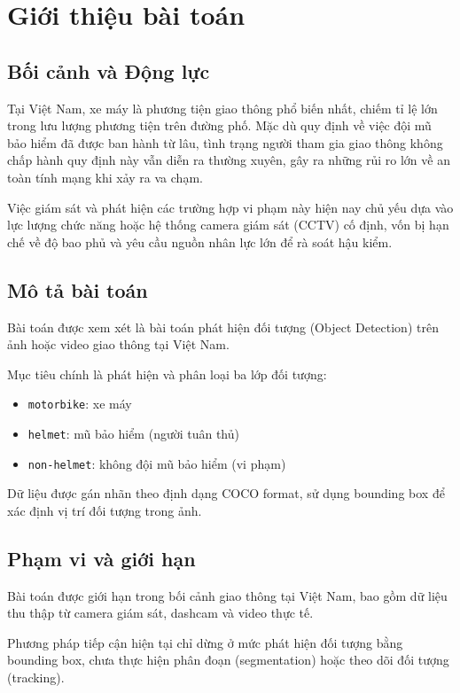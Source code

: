 \section{Giới thiệu bài toán}
\subsection{Bối cảnh và Động lực}

Tại Việt Nam, xe máy là phương tiện giao thông phổ biến nhất, chiếm tỉ lệ lớn trong lưu lượng phương tiện trên đường phố. Mặc dù quy định về việc đội mũ bảo hiểm đã được ban hành từ lâu, tình trạng người tham gia giao thông không chấp hành quy định này vẫn diễn ra thường xuyên, gây ra những rủi ro lớn về an toàn tính mạng khi xảy ra va chạm.

Việc giám sát và phát hiện các trường hợp vi phạm này hiện nay chủ yếu dựa vào lực lượng chức năng hoặc hệ thống camera giám sát (CCTV) cố định, vốn bị hạn chế về độ bao phủ và yêu cầu nguồn nhân lực lớn để rà soát hậu kiểm.

\subsection{Mô tả bài toán}

Bài toán được xem xét là bài toán phát hiện đối tượng (Object Detection) trên ảnh hoặc video giao thông tại Việt Nam.

Mục tiêu chính là phát hiện và phân loại ba lớp đối tượng:

\begin{itemize}
    \item \texttt{motorbike}: xe máy
    \item \texttt{helmet}: mũ bảo hiểm (người tuân thủ)
    \item \texttt{non-helmet}: không đội mũ bảo hiểm (vi phạm)
\end{itemize}

Dữ liệu được gán nhãn theo định dạng COCO format, sử dụng bounding box để xác định vị trí đối tượng trong ảnh.

\subsection{Phạm vi và giới hạn}

Bài toán được giới hạn trong bối cảnh giao thông tại Việt Nam, bao gồm dữ liệu thu thập từ camera giám sát, dashcam và video thực tế.

Phương pháp tiếp cận hiện tại chỉ dừng ở mức phát hiện đối tượng bằng bounding box, chưa thực hiện phân đoạn (segmentation) hoặc theo dõi đối tượng (tracking).